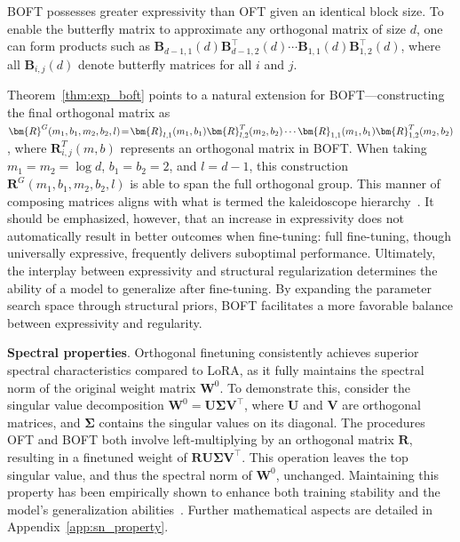 \begin{theorem}\label{thm:exp_boft}
    BOFT possesses greater expressivity than OFT given an identical block size. To enable the butterfly matrix to approximate any orthogonal matrix of size $d$, one can form products such as $\bm{B}_{d-1,1}(d)\bm{B}^\top_{d-1,2}(d)\cdots\bm{B}_{1,1}(d)\bm{B}^\top_{1,2}(d)$, where all $\bm{B}_{i,j}(d)$ denote butterfly matrices for all $i$ and $j$.
\end{theorem}

Theorem~\ref{thm:exp_boft} points to a natural extension for BOFT—constructing the final orthogonal matrix as $\thickmuskip=2mu \medmuskip=2mu \bm{R}^G(m_1,b_1,m_2,b_2,l)=\bm{R}_{l,1}(m_1,b_1)\bm{R}_{l,2}^T(m_2,b_2)\cdots\bm{R}_{1,1}(m_1,b_1)\bm{R}_{1,2}^T(m_2,b_2)$, where $\bm{R}_{i,j}^T(m,b)$ represents an orthogonal matrix in BOFT. When taking $m_1=m_2=\log d$, $b_1=b_2=2$, and $l=d-1$, this construction $\bm{R}^G(m_1,b_1,m_2,b_2,l)$ is able to span the full orthogonal group. This manner of composing matrices aligns with what is termed the kaleidoscope hierarchy~\cite{dao2019kaleidoscope}. It should be emphasized, however, that an increase in expressivity does not automatically result in better outcomes when fine-tuning: full fine-tuning, though universally expressive, frequently delivers suboptimal performance. Ultimately, the interplay between expressivity and structural regularization determines the ability of a model to generalize after fine-tuning. By expanding the parameter search space through structural priors, BOFT facilitates a more favorable balance between expressivity and regularity.

\textbf{Spectral properties}. Orthogonal finetuning consistently achieves superior spectral characteristics compared to LoRA, as it fully maintains the spectral norm of the original weight matrix $\bm{W}^0$. To demonstrate this, consider the singular value decomposition $\bm{W}^0=\bm{U}\bm{\Sigma}\bm{V}^\top$, where $\bm{U}$ and $\bm{V}$ are orthogonal matrices, and $\bm{\Sigma}$ contains the singular values on its diagonal. The procedures OFT and BOFT both involve left-multiplying by an orthogonal matrix $\bm{R}$, resulting in a finetuned weight of $\bm{R}\bm{U}\bm{\Sigma}\bm{V}^\top$. This operation leaves the top singular value, and thus the spectral norm of $\bm{W}^0$, unchanged. Maintaining this property has been empirically shown to enhance both training stability and the model's generalization abilities~\cite{miyato2018spectral,yoshida2017spectral}. Further mathematical aspects are detailed in Appendix~\ref{app:sn_property}.

